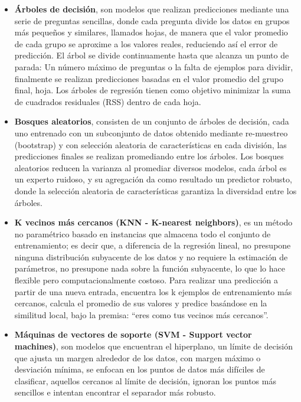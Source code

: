 \begin{itemize}
\item
  \textbf{Árboles de decisión}, son modelos que realizan predicciones mediante una serie de preguntas sencillas, donde cada pregunta divide los datos en grupos más pequeños y similares, llamados hojas, de manera que el valor promedio de cada grupo se aproxime a los valores reales, reduciendo así el error de predicción. El árbol se divide continuamente hasta que alcanza un punto de parada: Un número máximo de preguntas o la falta de ejemplos para dividir, finalmente se realizan predicciones basadas en el valor promedio del grupo final, hoja. Los árboles de regresión tienen como objetivo minimizar la suma de cuadrados residuales (RSS) dentro de cada hoja.
\item
  \textbf{Bosques aleatorios}, consisten de un conjunto de árboles de decisión, cada uno entrenado con un subconjunto de datos obtenido mediante re-muestreo (bootstrap) y con selección aleatoria de características en cada división, las predicciones finales se realizan promediando entre los árboles. Los bosques aleatorios reducen la varianza al promediar diversos modelos, cada árbol es un experto ruidoso, y su agregación da como resultado un predictor robusto, donde la selección aleatoria de características garantiza la diversidad entre los árboles.
\item
  \textbf{K vecinos más cercanos (KNN - K-nearest neighbors)}, es un método no paramétrico basado en instancias que almacena todo el conjunto de entrenamiento; es decir que, a diferencia de la regresión lineal, no presupone ninguna distribución subyacente de los datos y no requiere la estimación de parámetros, no presupone nada sobre la función subyacente, lo que lo hace flexible pero computacionalmente costoso. Para realizar una predicción a partir de una nueva entrada, encuentra los k ejemplos de entrenamiento más cercanos, calcula el promedio de sus valores y predice basándose en la similitud local, bajo la premisa: ``eres como tus vecinos más cercanos''.
\item
  \textbf{Máquinas de vectores de soporte (SVM - Support vector machines)}, son modelos que encuentran el hiperplano, un límite de decisión que ajusta un margen alrededor de los datos, con margen máximo o desviación mínima, se enfocan en los puntos de datos más difíciles de clasificar, aquellos cercanos al límite de decisión, ignoran los puntos más sencillos e intentan encontrar el separador más robusto.
\end{itemize}

